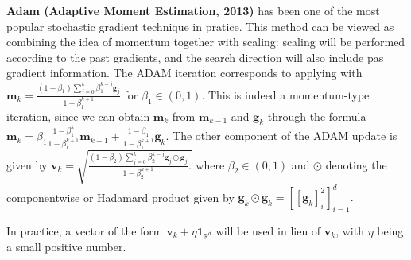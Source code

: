 \documentclass[a4paper,6pt]{extarticle}
\begin{document}
\begin{multicols}{2}
{\textbf{Adam (Adaptive Moment Estimation, 2013)} has been one of the most popular stochastic gradient technique in pratice. This method can be viewed as combining the idea of momentum together with scaling: scaling will be performed according to the past gradients, and the search direction will also include pas gradient information. The ADAM iteration corresponds to applying with
$
\boldsymbol{m}_k=\frac{\left(1-\beta_1\right) \sum_{j=0}^k \beta_1^{k-j} \boldsymbol{g}_j}{1-\beta_1^{k+1}}
$
for $\beta_1 \in(0,1)$. This is indeed a momentum-type iteration, since we can obtain $\boldsymbol{m}_k$ from $\boldsymbol{m}_{k-1}$ and $\boldsymbol{g}_k$ through the formula
$
\boldsymbol{m}_k=\beta_1 \frac{1-\beta_1^k}{1-\beta_1^{k+1}} \boldsymbol{m}_{k-1}+\frac{1-\beta_1}{1-\beta_1^{k+1}} \boldsymbol{g}_k .
$
The other component of the ADAM update is given by
$
\boldsymbol{v}_k=\sqrt{\frac{\left(1-\beta_2\right) \sum_{j=0}^k \beta_2^{k-j} \boldsymbol{g}_j \odot \boldsymbol{g}_j}{1-\beta_2^{k+1}} .}
$
where $\beta_2 \in(0,1)$ and $\odot$ denoting the componentwise or Hadamard product given by
$
\boldsymbol{g}_k \odot \boldsymbol{g}_k=\left[\left[\boldsymbol{g}_k\right]_i^2\right]_{i=1}^d .
$

In practice, a vector of the form $\boldsymbol{v}_k+\eta \mathbf{1}_{\mathbb{R}^d}$ will be used in lieu of $\boldsymbol{v}_k$, with $\eta$ being a small positive number.

}

\end{multicols}

\end{document}
